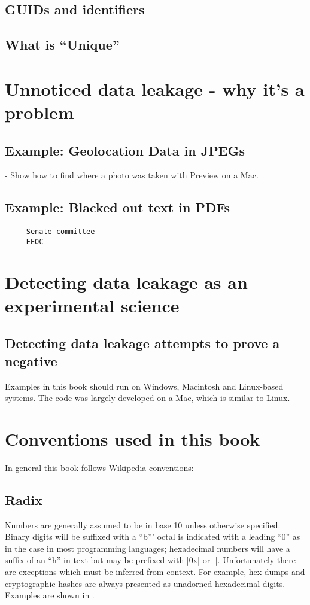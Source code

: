 \subsection{GUIDs and identifiers}
\subsection{What is ``Unique''}
\section{Unnoticed data leakage - why it's a problem}
\subsection{Example: Geolocation Data in JPEGs}
  - Show how to find where a photo was taken with Preview on a Mac. 
\subsection{Example: Blacked out text in PDFs}
\begin{Verbatim}
   - Senate committee
   - EEOC
\end{Verbatim}
\section{Detecting data leakage as an experimental science}
\subsection{Detecting data leakage attempts to prove a negative}


Examples in this book should run on Windows, Macintosh and Linux-based
systems. The code was largely developed on a Mac, which is similar to
Linux. 

\section{Conventions used in this book}
In general this book follows Wikipedia conventions:


\subsection{Radix}
Numbers are generally assumed to be in base 10 unless otherwise
specified. Binary digits will be suffixed with a ``b''' octal
is indicated with a leading ``0'' as in the case in most programming
languages; hexadecimal numbers will have a suffix of an ``h'' in text
but may be prefixed with |0x| or |\x|. Unfortunately there are
exceptions which must be inferred from context. For example, hex dumps
and cryptographic hashes are always presented as unadorned hexadecimal
digits. Examples are shown in .

